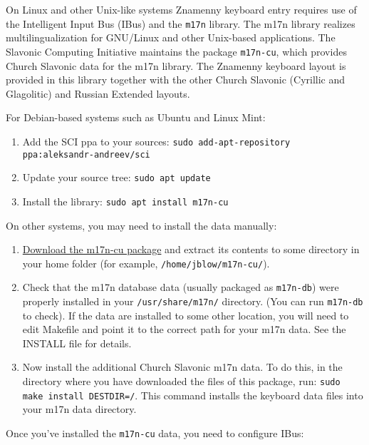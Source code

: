 \documentclass[11pt]{article}
\begin{document}
On Linux and other Unix-like systems Znamenny keyboard entry requires
use of the Intelligent Input Bus (IBus) and the \texttt{m17n} library.
The m17n library realizes multilingualization for
GNU/Linux and other Unix-based applications. The Slavonic Computing Initiative
maintains the package \texttt{m17n-cu}, which provides Church Slavonic data for
the m17n library. The Znamenny keyboard layout is provided in this library
together with the other Church Slavonic (Cyrillic and Glagolitic) and Russian
Extended layouts.

For Debian-based systems such as Ubuntu and Linux Mint:
\begin{enumerate}
\item Add the SCI ppa to your sources: \texttt{sudo add-apt-repository ppa:aleksandr-andreev/sci}
\item Update your source tree: \texttt{sudo apt update}
\item Install the library: \texttt{sudo apt install m17n-cu}
\end{enumerate}

On other systems, you may need to install the data manually:

\begin{enumerate}
\item \href{https://github.com/typiconman/m17n-cu/releases}{Download the m17n-cu package}
and extract its contents to some directory in your home folder (for
example, \texttt{/home/jblow/m17n-cu/}).

\item Check that the m17n database data (usually packaged as \texttt{m17n-db}) were
properly installed in your \texttt{/usr/share/m17n/} directory.
(You can run \texttt{m17n-db} to check). If the data are installed to some
other location, you will need to edit Makefile and point it to the correct
path for your m17n data. See the INSTALL file for details.

\item Now install the additional Church Slavonic m17n data.
To do this, in the directory where you have downloaded the
files of this package, run: \texttt{sudo make install DESTDIR=/}.
This command installs the keyboard data files into your m17n data directory.
\end{enumerate}

Once you've installed the \texttt{m17n-cu} data, you need to configure IBus:
\end{document}
